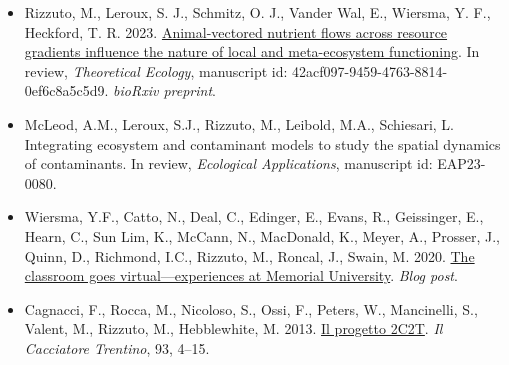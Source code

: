 \begin{itemize}
  \item \textcolor{awesome}{Rizzuto, M.}, Leroux, S. J., Schmitz, O. J., Vander Wal, E., Wiersma, Y. F., Heckford, T. R. 2023. \href{https://doi.org/10.1101/2023.03.03.530982}{Animal-vectored nutrient flows across resource gradients influence the nature of local and meta-ecosystem functioning}. In review, \emph{Theoretical Ecology}, manuscript id: 42acf097-9459-4763-8814-0ef6c8a5c5d9. \emph{bioRxiv preprint}.
  \item McLeod, A.M., Leroux, S.J., \textcolor{awesome}{Rizzuto, M.}, Leibold, M.A., Schiesari, L. Integrating ecosystem and contaminant models to study the spatial dynamics of contaminants. In review, \emph{Ecological Applications}, manuscript id: EAP23-0080.
\end{itemize}


\begin{itemize}
  \item Wiersma, Y.F., Catto, N., Deal, C., Edinger, E., Evans, R., Geissinger, E., Hearn, C., Sun Lim, K., McCann, N., MacDonald, K., Meyer, A., Prosser, J., Quinn, D., Richmond, I.C., \textcolor{awesome}{Rizzuto, M.}, Roncal, J., Swain, M. 2020. \href{https://nllandscapeecology.com/blog-post-teaching-and-learning-remotely-time-to-read-4-min-45-s/}{The classroom goes virtual---experiences at Memorial University}. \emph{Blog post}.
  \item Cagnacci, F., Rocca, M., Nicoloso, S., Ossi, F., Peters, W., Mancinelli, S., Valent, M., \textcolor{awesome}{Rizzuto, M.}, Hebblewhite, M. 2013. \href{https://en.calameo.com/read/00214567355b1384f96d0}{Il progetto 2C2T}. \emph{Il Cacciatore Trentino}, 93, 4--15.
\end{itemize}


  


  
